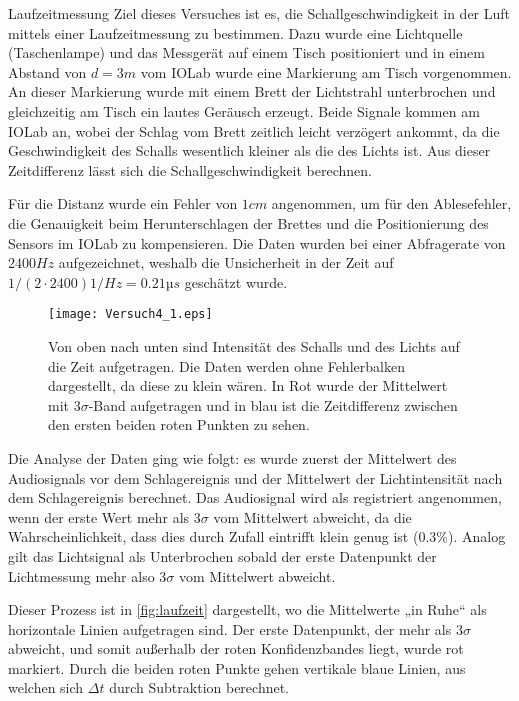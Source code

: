 \documentclass{alex_gp}
\begin{document}
\begin{mybox}{Laufzeitmessung}
	Ziel dieses Versuches ist es, die Schallgeschwindigkeit in der Luft mittels einer Laufzeitmessung zu bestimmen. Dazu wurde eine Lichtquelle (Taschenlampe) und das Messgerät auf einem Tisch positioniert und in einem Abstand von \( d = 3 \unit{m} \) vom IOLab wurde eine Markierung am Tisch vorgenommen. An dieser Markierung wurde mit einem Brett der Lichtstrahl unterbrochen und gleichzeitig am Tisch ein lautes Geräusch erzeugt. Beide Signale kommen am IOLab an, wobei der Schlag vom Brett zeitlich leicht verzögert ankommt, da die Geschwindigkeit des Schalls wesentlich kleiner als die des Lichts ist. Aus dieser Zeitdifferenz lässt sich die Schallgeschwindigkeit berechnen. 
	
	Für die Distanz wurde ein Fehler von \( 1 \unit{cm} \) angenommen, um für den Ablesefehler, die Genauigkeit beim Herunterschlagen der Brettes und die Positionierung des Sensors im IOLab zu kompensieren. Die Daten wurden bei einer Abfragerate von \( 2400 \unit{Hz} \) aufgezeichnet, weshalb die Unsicherheit in der Zeit auf \( 1/(2\cdot2400) \unit{1/Hz} = 0.21 \unit{µs} \) geschätzt wurde.
	
	\begin{figure}[H]	
		\centering
		\texttt{[image: Versuch4\_1.eps]}
		\caption{Von oben nach unten sind Intensität des Schalls und des Lichts auf die Zeit aufgetragen. Die Daten werden ohne Fehlerbalken dargestellt, da diese zu klein wären. In Rot wurde der Mittelwert mit \( 3\sigma \)-Band aufgetragen und in blau ist die Zeitdifferenz zwischen den ersten beiden roten Punkten zu sehen.}
		\label{fig:laufzeit}
	\end{figure}

	Die Analyse der Daten ging wie folgt: es wurde zuerst der Mittelwert des Audiosignals vor dem Schlagereignis und der Mittelwert der Lichtintensität nach dem Schlagereignis berechnet. Das Audiosignal wird als registriert angenommen, wenn der erste Wert mehr als \( 3\sigma \) vom Mittelwert abweicht, da die Wahrscheinlichkeit, dass dies durch Zufall eintrifft klein genug ist (\( 0.3 \% \)). Analog gilt das Lichtsignal als Unterbrochen sobald der erste Datenpunkt der Lichtmessung mehr also \( 3\sigma \) vom Mittelwert abweicht. 
	
	Dieser Prozess ist in \autoref{fig:laufzeit} dargestellt, wo die Mittelwerte „in Ruhe“ als horizontale Linien aufgetragen sind. Der erste Datenpunkt, der mehr als \( 3\sigma \) abweicht, und somit außerhalb der roten Konfidenzbandes liegt, wurde rot markiert. Durch die beiden roten Punkte gehen vertikale blaue Linien, aus welchen sich \( \Delta t \) durch Subtraktion berechnet.
	

\end{mybox}
\end{document}
